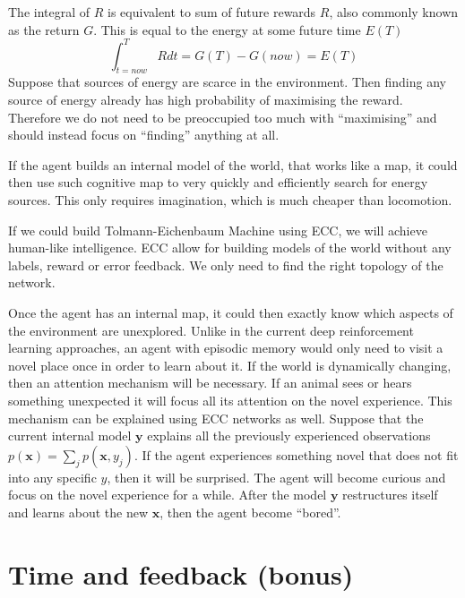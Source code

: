 \documentclass[12pt]{article}
\begin{document}
The integral of $R$ is equivalent to sum of future rewards $R$, also commonly known as the return $G$. This is equal to the energy at some future time $E(T)$
\[
\int_{t=now}^{T} R dt = G(T) - G(now) = E(T)
\]
Suppose that sources of energy are scarce in the environment. Then finding any source of energy already has high probability of maximising the reward. Therefore we do not need to be preoccupied too much with ``maximising'' and should instead focus on ``finding'' anything at all. 

If the agent builds an internal model of the world, that works like a map, it could then use such cognitive map to very quickly and efficiently search for energy sources. This only requires imagination, which is much cheaper than locomotion.

If we could build Tolmann-Eichenbaum Machine using ECC, we will achieve human-like intelligence.  ECC allow for building models of the world without any labels, reward or error feedback. We only need to find the right topology of the network.

Once the agent has an internal map, it could then exactly know which aspects of the environment are unexplored. Unlike in the current deep reinforcement learning approaches, an agent with episodic memory would only need to visit a novel place once in order to learn about it. If the world is dynamically changing, then an attention mechanism will be necessary. If an animal sees or hears something unexpected it will focus all its attention on the novel experience. This mechanism can be explained using ECC networks as well. Suppose that the current internal model $\boldsymbol{y}$ explains all the previously experienced observations $p(\boldsymbol{x})=\sum_j p(\boldsymbol{x},y_j)$. If the agent experiences something novel that does not fit into any specific $y$, then it will be surprised. The agent will become curious and focus on the novel experience for a while. After the model  $\boldsymbol{y}$ restructures itself and learns about the new $\boldsymbol{x}$, then the agent become ``bored''. 

\section{Time and feedback (bonus)}
\end{document}
